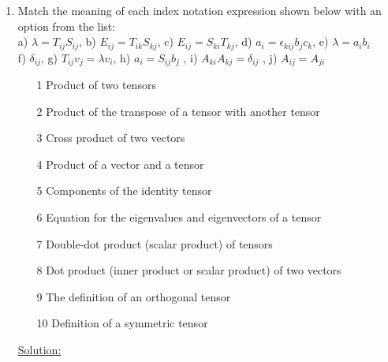 \documentclass{article}
\newcommand{\bi}{\begin{itemize}}
\newcommand{\ei}{\end{itemize}}
\begin{document}
\begin{enumerate}
\newpage
\item Match the meaning of each index notation expression shown below with an option from the list: \\
a) $\lambda =T_{ij}S_{ij}$, \quad b)  $E_{ij}=T_{ik}S_{kj}$, \quad c) $E_{ij}=S_{ki}T_{kj}$, \quad d) 
$a_i=\epsilon_{kij}b_j c_k$, \quad e)  $\lambda=a_ib_i$ \\
f) $\delta_{ij}$, \quad g) $T_{ij}v_j=\lambda v_i$, \quad h) $a_i=S_{ij}b_j$ , \quad i) $A_{ki}A_{kj}=\delta_{ij}$ ,
\quad j) $A_{ij}=A_{ji}$ \\
\bi
\item[1] Product of two tensors
\item[2] Product of the transpose of a tensor with another tensor
\item[3] Cross product of two vectors
\item[4] Product of a vector and a tensor
\item[5] Components of the identity tensor
\item[6] Equation for the eigenvalues and eigenvectors of a tensor
\item[7] Double-dot product (scalar product) of tensors
\item[8] Dot product (inner product or scalar product) of two vectors
\item[9] The definition of an orthogonal tensor
\item[10] Definition of a symmetric tensor
\ei
\underline{Solution:}


\end{enumerate}
\end{document}
